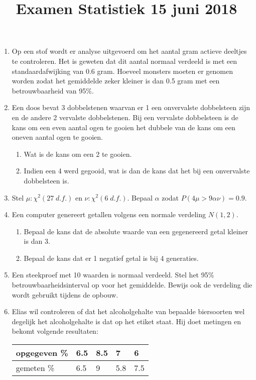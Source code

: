 \documentclass{article}
\title{Examen Statistiek 15 juni 2018}
\author{}
\date{}
\begin{document}
\maketitle
 \begin{enumerate}
  \item Op een stof wordt er analyse uitgevoerd om het aantal gram actieve deeltjes te controleren. Het is geweten dat dit aantal normaal verdeeld is met een standaardafwijking van 0.6 gram. Hoeveel monsters moeten er genomen worden zodat het gemiddelde zeker kleiner is dan 0.5 gram met een betrouwbaarheid van 95\%.
  \item Een doos bevat 3 dobbelstenen waarvan er 1 een onvervalste dobbelsteen zijn en de andere 2 vervalste dobbelstenen. Bij een vervalste dobbelsteen is de kans om een even aantal ogen te gooien het dubbele van de kans om een oneven aantal ogen te gooien. 
    \begin{enumerate}
        \item Wat is de kans om een 2 te gooien.
        \item Indien een 4 werd gegooid, wat is dan de kans dat het bij een onvervalste dobbelsteen is.
    \end{enumerate}
  
  \item Stel $\mu: \chi^2(27\; d.f.)$ en $\nu: \chi^2(6\;d.f.)$. Bepaal $\alpha$ zodat $P(4\mu > 9\alpha\nu) = 0.9$.
  
  \item Een computer genereert getallen volgens een normale verdeling $N(1, 2)$. 
    \begin{enumerate}
        \item Bepaal de kans dat de absolute waarde van een gegenereerd getal kleiner is dan 3.
        \item Bepaal de kans dat er 1 negatief getal is bij 4 generaties.
    \end{enumerate}
  
  \item Een steekproef met 10 waarden is normaal verdeeld. Stel het 95$\%$ betrouwbaarheidsinterval op voor het gemiddelde. Bewijs ook de verdeling die wordt gebruikt tijdens de opbouw.
  
  \item Elias wil controleren of dat het alcoholgehalte van bepaalde biersoorten wel degelijk het alcoholgehalte is dat op het etiket staat. Hij doet metingen en bekomt volgende resultaten:
  
  \begin{tabular}{l | l | l | l | l}
  opgegeven \% & 6.5 & 8.5 & 7 & 6  \\
  \hline
  gemeten \%  & 6.5 & 9 & 5.8 & 7.5
   

\end{tabular}
\end{enumerate}
\end{document}
